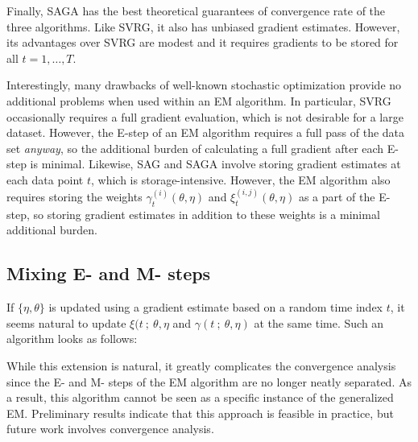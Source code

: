 Finally, SAGA has the best theoretical guarantees of convergence rate of the three algorithms. Like SVRG, it also has unbiased gradient estimates. However, its advantages over SVRG are modest and it requires gradients to be stored for all $t = 1,\ldots,T$.

Interestingly, many drawbacks of well-known stochastic optimization provide no additional problems when used within an EM algorithm. In particular, SVRG occasionally requires a full gradient evaluation, which is not desirable for a large dataset. However, the E-step of an EM algorithm requires a full pass of the data set \textit{anyway}, so the additional burden of calculating a full gradient after each E-step is minimal. Likewise, SAG and SAGA involve storing gradient estimates at each data point $t$, which is storage-intensive. However, the EM algorithm also requires storing the weights $\gamma_t^{(i)}(\theta, \eta)$ and $\xi_t^{(i,j)}(\theta, \eta)$ as a part of the E-step, so storing gradient estimates in addition to these weights is a minimal additional burden.



\subsection{Mixing E- and M- steps}

If $\{\eta,\theta\}$ is updated using a gradient estimate based on a random time index $t$, it seems natural to update $\xi(t ~;~ \theta,\eta$ and $\gamma(t ~;~ \theta,\eta)$ at the same time. Such an algorithm looks as follows:

While this extension is natural, it greatly complicates the convergence analysis since the E- and M- steps of the EM algorithm are no longer neatly separated. As a result, this algorithm cannot be seen as a specific instance of the generalized EM. Preliminary results indicate that this approach is feasible in practice, but future work involves convergence analysis.

